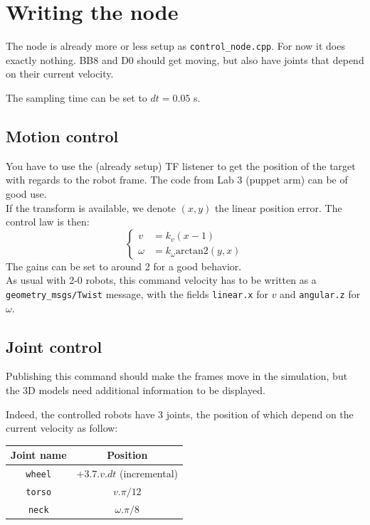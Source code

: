 \documentclass{ecnreport}
\begin{document}
\newpage

\section{Writing the node}

The node is already more or less setup as \texttt{control\_node.cpp}. For now it does exactly nothing. BB8 and D0 should get moving, but also have joints that depend on their current velocity.

The sampling time can be set to $dt = 0.05$ s.

\subsection{Motion control}

You have to use the (already setup) TF listener to get the position of the target with regards to the robot frame. The code from Lab 3 (puppet arm) can be of good use.\\

If the transform is available, we denote $(x,y)$ the linear position error. The control law is then:
\begin{equation*}
   \left\{\begin{array}{ll}
          v &= k_v(x-1) \\
          \omega &= k_\omega \text{arctan2}(y, x)
         \end{array}\right.
\end{equation*}
The gains can be set to around 2 for a good behavior.\\

As usual with 2-0 robots, this command velocity has to be written as a \texttt{geometry\_msgs/Twist} message, with the fields \texttt{linear.x} for $v$ and \texttt{angular.z} for $\omega$. 


\subsection{Joint control}

Publishing this command should make the frames move in the simulation, but the 3D models need additional information to be displayed.

Indeed, the controlled robots have 3 joints, the position of which depend on the current velocity as follow:

\begin{center}
 \begin{tabular}{|c|c|}\hline
  Joint name & Position \\\hline
  \texttt{wheel} & $+3.7.v.dt$ (incremental) \\\hline
  \texttt{torso} & $v.\pi/12$\\\hline
  \texttt{neck} & $\omega.\pi/8$\\\hline
 \end{tabular}
\end{center}
\end{document}
